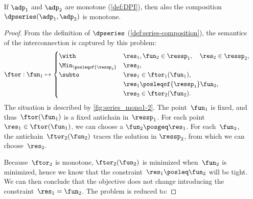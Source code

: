 \begin{proposition}
    \label{prop:series-monotone}
    If $\adp_{1}$ and $\adp_{2}$ are monotone (\cref{def:DPI}), then also the composition $\dpseries(\adp_{1},\adp_{2})$ is monotone.
\end{proposition}
\begin{proof}
    From the definition of $\dpseries$ (\cref{def:series-composition}), the semantics of the interconnection is captured by this problem:
    \begin{equation}
        \ftor:\fun_{1}\mapsto\begin{cases}
            \with                        & \res_{1},\fun_{2}\in\ressp_{1},\quad\res_{2}\in\ressp_{2}, \\
            \Min_{\posleqof{\ressp_{2}}} & \res_{2},                                                  \\
            \subto                       & \res_{1}\in\ftor_{1}(\fun_{1}),                            \\
                                         & \res_{1}\posleqof{\ressp_{1}}\fun_{2},                     \\
                                         & \res_{2}\in\ftor_{2}(\fun_{2}).
        \end{cases}\label{eq:dede}
    \end{equation}
    The situation is described by \cref{fig:series_mono1-2}.
    The point~$\fun_{1}$ is fixed, and thus~$\ftor(\fun_{1})$ is a fixed antichain in~$\ressp_{1}$.
    For each point $\res_{1}\in\ftor(\fun_{1})$, we can choose a $\fun_{2}\posgeq\res_{1}$.
    For each~$\fun_{2}$, the antichain~$\ftor_{2}(\fun_{2})$ traces the solution in $\ressp_{2}$, from which we can choose~$\res_{2}$.


    Because~$\ftor_{2}$ is monotone, $\ftor_{2}(\fun_{2})$ is minimized when~$\fun_{2}$ is minimized, hence we know that the constraint~$\res_{1}\posleq\fun_{2}$ will be tight.
    We can then conclude that the objective does not change introducing the constraint~$\res_{1}=\fun_{2}$.
    The problem is reduced to:


\end{proof}
